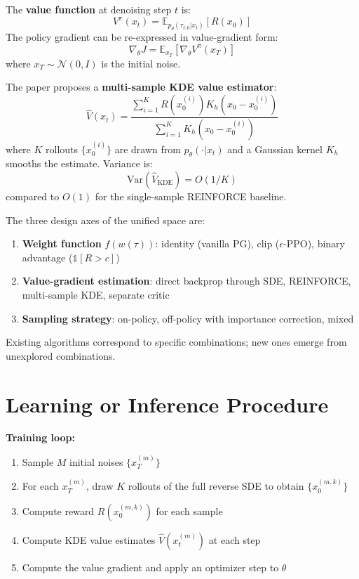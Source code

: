\documentclass[10pt,twocolumn]{article}
\begin{document}
The \textbf{value function} at denoising step $t$ is:
\[
  V^\pi(x_t) = \mathbb{E}_{p_\theta(\tau_{t:0} | x_t)}[R(x_0)]
\]
The policy gradient can be re-expressed in value-gradient form:
\[
  \nabla_\theta J = \mathbb{E}_{x_T}\!\left[\nabla_\theta V^\pi(x_T)\right]
\]
where $x_T \sim \mathcal{N}(0, I)$ is the initial noise.

The paper proposes a \textbf{multi-sample KDE value estimator}:
\[
  \hat{V}(x_t) = \frac{\sum_{i=1}^K R(x_0^{(i)}) K_h(x_0 - x_0^{(i)})}
                       {\sum_{i=1}^K K_h(x_0 - x_0^{(i)})}
\]
where $K$ rollouts $\{x_0^{(i)}\}$ are drawn from $p_\theta(\cdot | x_t)$
and a Gaussian kernel $K_h$ smooths the estimate. Variance is:
\[
  \text{Var}(\hat{V}_\text{KDE}) = O(1/K)
\]
compared to $O(1)$ for the single-sample REINFORCE baseline.

The three design axes of the unified space are:
\begin{enumerate}[itemsep=2pt,parsep=0pt]
  \item \textbf{Weight function} $f(w(\tau))$: identity (vanilla PG),
    clip ($\epsilon$-PPO), binary advantage ($\mathbb{1}[R > c]$)
  \item \textbf{Value-gradient estimation}: direct backprop through SDE,
    REINFORCE, multi-sample KDE, separate critic
  \item \textbf{Sampling strategy}: on-policy, off-policy with
    importance correction, mixed
\end{enumerate}
Existing algorithms correspond to specific combinations; new ones emerge
from unexplored combinations.

\section{Learning or Inference Procedure}

\textbf{Training loop:}
\begin{enumerate}[itemsep=2pt,parsep=0pt]
  \item Sample $M$ initial noises $\{x_T^{(m)}\}$
  \item For each $x_T^{(m)}$, draw $K$ rollouts of the full
    reverse SDE to obtain $\{x_0^{(m,k)}\}$
  \item Compute reward $R(x_0^{(m,k)})$ for each sample
  \item Compute KDE value estimates $\hat{V}(x_t^{(m)})$ at each step
  \item Compute the value gradient and apply an optimizer step to $\theta$
\end{enumerate}
\end{document}
